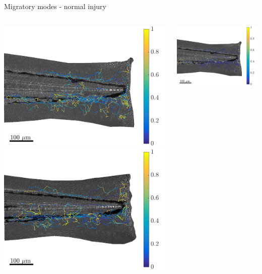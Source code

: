 \documentclass[mathserif,11pt]{beamer}
\begin{document}
\begin{frame}{Migratory modes - normal injury}
\begin{columns}
\begin{column}{0.31\textwidth}
		\vspace{-0.2cm}
		\includegraphics[scale=0.18]{Figures/mode2_fish1.png}\vfil
		\vspace{0.2cm}
		\includegraphics[scale=0.18]{Figures/mode2_fish3.png}
	\end{column}
	\begin{column}{0.31\textwidth}
		\vspace{-0.2cm}
		\includegraphics[scale=0.18]{Figures/mode3_fish1.png}\vfil

\end{column}
\end{columns}
\end{frame}
\end{document}
